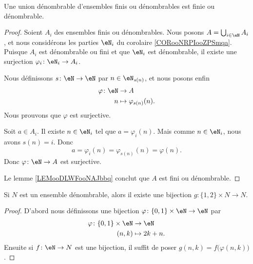\begin{proposition}     \label{PROPooENTPooSPpmhY}
    Une union dénombrable d'ensembles finis ou dénombrables est finie ou dénombrable.
\end{proposition}

\begin{proof}
    Soient \( A_i\) des ensembles finis ou dénombrables. Nous posons \( A=\bigcup_{i\in \eN}A_i\), et nous considérons les parties \( \eN_i\) du corolaire \ref{CORooNRPIooZPSmqa}. Puisque \( A_i\) est dénombrable ou fini et que \( \eN_i\) est dénombrable, il existe une surjection \( \varphi_i\colon \eN_i\to A_i\).

    Nous définissons \( s\colon \eN\to \eN\) par \( n\in \eN_{s(n)}\), et nous posons enfin
    \begin{equation}
        \begin{aligned}
            \varphi\colon \eN&\to A \\
            n&\mapsto \varphi_{s(n)}(n). 
        \end{aligned}
    \end{equation}
    Nous prouvons que \( \varphi\) est surjective.

    Soit \( a\in A_i\). Il existe \( n\in \eN_i\) tel que \( a=\varphi_i(n)\). Mais comme \( n\in \eN_i\), nous avons \( s(n)=i\). Donc
    \begin{equation}
        a=\varphi_i(n)=\varphi_{s(n)}(n)=\varphi(n).
    \end{equation}
    Donc \( \varphi\colon \eN\to A\) est surjective.

    Le lemme \ref{LEMooDLWFooNAJbbq} conclut que \( A\) est fini ou dénombrable.
\end{proof}

\begin{lemma}        \label{LEMooRXSRooBUWOyb}
    Si \( N\) est un ensemble dénombrable, alors il existe une bijection \( g\colon \{ 1,2 \}\times N\to N\).
\end{lemma}

\begin{proof}
    D'abord nous définissons une bijection \( \varphi\colon \{ 0,1 \}\times \eN\to \eN\) par
    \begin{equation}
        \begin{aligned}
            \varphi\colon \{ 0,1 \}\times \eN&\to \eN \\
            (n,k)&\mapsto 2k+n. 
        \end{aligned}
    \end{equation}
    Ensuite si \( f\colon \eN\to N\) est une bijection, il suffit de poser \( g(n,k)=f\big( \varphi(n,k) \big)\).
\end{proof}

